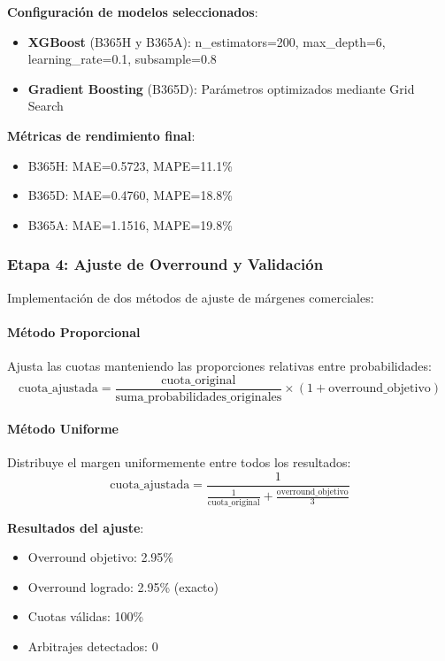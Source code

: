 \documentclass{article}
\begin{document}
\textbf{Configuración de modelos seleccionados}:
\begin{itemize}
    \item \textbf{XGBoost} (B365H y B365A): n\_estimators=200, max\_depth=6, learning\_rate=0.1, subsample=0.8
    \item \textbf{Gradient Boosting} (B365D): Parámetros optimizados mediante Grid Search
\end{itemize}

\textbf{Métricas de rendimiento final}:
\begin{itemize}
    \item B365H: MAE=0.5723, MAPE=11.1\%
    \item B365D: MAE=0.4760, MAPE=18.8\%
    \item B365A: MAE=1.1516, MAPE=19.8\%
\end{itemize}

\subsubsection{Etapa 4: Ajuste de Overround y Validación}

Implementación de dos métodos de ajuste de márgenes comerciales:

\paragraph{Método Proporcional}
Ajusta las cuotas manteniendo las proporciones relativas entre probabilidades:
\[
\text{cuota\_ajustada} = \frac{\text{cuota\_original}}{\text{suma\_probabilidades\_originales}} \times (1 + \text{overround\_objetivo})
\]

\paragraph{Método Uniforme}
Distribuye el margen uniformemente entre todos los resultados:
\[
\text{cuota\_ajustada} = \frac{1}{\frac{1}{\text{cuota\_original}} + \frac{\text{overround\_objetivo}}{3}}
\]

\textbf{Resultados del ajuste}:
\begin{itemize}
    \item Overround objetivo: 2.95\%
    \item Overround logrado: 2.95\% (exacto)
    \item Cuotas válidas: 100\%
    \item Arbitrajes detectados: 0
\end{itemize}
\end{document}
